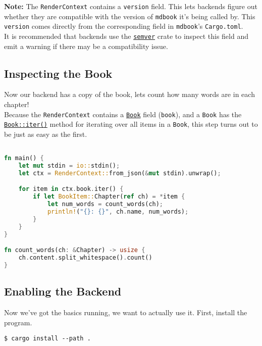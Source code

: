 \documentclass{article}
\begin{document}
\textbf{Note:} The \lstinline|RenderContext| contains a \lstinline|version| field. This lets backends
figure out whether they are compatible with the version of \lstinline|mdbook| it's being
called by. This \lstinline|version| comes directly from the corresponding field in
\lstinline|mdbook|'s \lstinline|Cargo.toml|.\\

It is recommended that backends use the \href{https://crates.io/crates/semver}{\lstinline|semver|} crate to inspect this field
and emit a warning if there may be a compatibility issue.\\

\subsection{Inspecting the Book}
\label{Inspecting the Book}
\label{inspecting-the-book}

Now our backend has a copy of the book, lets count how many words are in each
chapter!\\

Because the \lstinline|RenderContext| contains a \href{https://docs.rs/mdbook/*/mdbook/book/struct.Book.html}{\lstinline|Book|} field (\lstinline|book|), and a \lstinline|Book| has
the \href{https://docs.rs/mdbook/*/mdbook/book/struct.Book.html#method.iter}{\lstinline|Book::iter()|} method for iterating over all items in a \lstinline|Book|, this step
turns out to be just as easy as the first.\\
\begin{lstlisting}[language=rust]

fn main() {
    let mut stdin = io::stdin();
    let ctx = RenderContext::from_json(&mut stdin).unwrap();

    for item in ctx.book.iter() {
        if let BookItem::Chapter(ref ch) = *item {
            let num_words = count_words(ch);
            println!("{}: {}", ch.name, num_words);
        }
    }
}

fn count_words(ch: &Chapter) -> usize {
    ch.content.split_whitespace().count()
}

\end{lstlisting}

\subsection{Enabling the Backend}
\label{Enabling the Backend}
\label{enabling-the-backend}

Now we've got the basics running, we want to actually use it. First, install the
program.\\
\begin{lstlisting}[language=shell]
$ cargo install --path .

\end{lstlisting}
\end{document}

